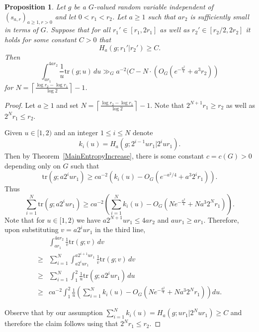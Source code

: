 \documentclass[10pt, english,oneside,reqno]{amsart}
\theoremstyle{plain}
\newtheorem{proposition}[theorem]{Proposition}
\theoremstyle{remark}
\numberwithin{equation}{section}
\numberwithin{figure}{section}
\newcommand{\tr}{\mathrm{tr}}
\begin{document}
\begin{proposition}\label{trIntBound}
    Let $g$ be a $G$-valued random variable independent of $(s_{a,r})_{a \geq 1, r> 0}$ and let $0 < r_1 < r_2$. Let $a \geq 1$ such that $ar_2$ is sufficiently small in terms of $G$. Suppose that for all $r_1' \in [r_1, 2r_1]$ as well as $r_2' \in [r_2/2, 2r_2]$ it holds for some constant $C> 0$ that $$H_a(g; r_1'| r_2') \geq C.$$ Then $$\int_{ar_1}^{4ar_2} \frac{1}{u} \tr(g;u) \, du \gg_G a^{-2}(C - N\cdot (O_G(e^{-\frac{a^2}{4}} + a^3r_2))$$ for $N = \left\lceil \frac{\log r_2 - \log r_1}{\log 2} \right\rceil - 1$.
\end{proposition}

\begin{proof}
    Let $a \geq 1$ and set $ N = \left\lceil \frac{\log r_2 - \log r_1}{\log 2} \right\rceil - 1 $. Note that $2^{N+1} r_1 \geq r_2$ as well as $2^{N} r_1 \leq r_2$.
    
    Given $u \in [1,2)$ and an integer $1\leq i \leq N$ denote $$k_i(u) = H_a(g; 2^{i-1}ur_1| 2^i u r_1).$$ Then by Theorem~\ref{MainEntropyIncrease}, there is some constant $c = c(G) > 0$ depending only on $G$ such that 
    \begin{equation}\label{trbound}
        \mathrm{tr}(g; a 2^i u r_1) \geq c a^{-2}(k_i(u) - O_G(e^{-a^2/4} + a^3 2^i r_1) ).
    \end{equation} Thus $$\sum_{i = 1}^{N} \tr(g; a2^i u r_1) \geq ca^{-2} \left( \sum_{i = 1}^N k_i(u) - O_G(Ne^{-\frac{a^2}{4}} + Na^3 2^N r_1) \right).$$ Note that for $u \in [1,2)$ we have $a2^{N + 1} u r_1 \leq 4ar_2$ and $a u r_1 \geq a r_1$. Therefore, upon substituting $v = a2^{i}ur_1$ in the third line, \begin{align}
        &\int_{ar_1}^{4ar_2}  \frac{1}{v} \tr(g; v) \, dv \nonumber \\ \geq &\sum_{i = 1}^{N} \int_{a2^{i} u r_1}^{a2^{i + 1}u r_1} \frac{1}{v} \tr(g; v) \, dv \nonumber\\
        \geq &\sum_{i = 1}^{N} \int_{1}^{2} \frac{1}{u} \tr(g; a 2^i ur_1) \, du \nonumber \\
        \geq &ca^{-2} \int_1^2 \frac{1}{u}\left( \sum_{i = 1}^N k_i(u) - O_{G}(Ne^{-\frac{a^2}{4}} + N a^3 2^N r_1)\right) du. \label{IntBound}
    \end{align}

    Observe that by our assumption $\sum_{i = 1}^N k_i(u) = H_a(g; ur_1| 2^N ur_1 ) \geq C$  and therefore the claim follows using that $2^N r_1 \leq r_2$. 
\end{proof}
\end{document}
